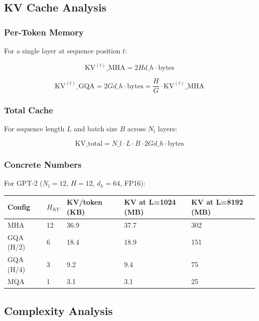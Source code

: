 \subsection{KV Cache Analysis}

\subsubsection{Per-Token Memory}

For a single layer at sequence position $t$:

\[
\text{KV}^{(t)}\_\text{MHA} = 2 H d\_h \cdot \text{bytes}
\tag{4.5}
\]

\[
\text{KV}^{(t)}\_\text{GQA} = 2 G d\_h \cdot \text{bytes} = \frac{H}{G} \cdot \text{KV}^{(t)}\_\text{MHA}
\tag{4.6}
\]

\subsubsection{Total Cache}

For sequence length $L$ and batch size $B$ across $N_l$ layers:

\[
\text{KV}\_\text{total} = N\_l \cdot L \cdot B \cdot 2 G d\_h \cdot \text{bytes}
\tag{4.7}
\]

\subsubsection{Concrete Numbers}

For GPT-2 ($N_l = 12$, $H = 12$, $d_h = 64$, FP16):

\begin{table}[H]
\centering
\small
\begin{tabular}{lllll}
\toprule
\textbf{Config} & \textbf{$H_{KV}$} & \textbf{KV/token (KB)} & \textbf{KV at L=1024 (MB)} & \textbf{KV at L=8192 (MB)} \\
\midrule
MHA & 12 & 36.9 & 37.7 & 302 \\
GQA (H/2) & 6 & 18.4 & 18.9 & 151 \\
GQA (H/4) & 3 & 9.2 & 9.4 & 75 \\
MQA & 1 & 3.1 & 3.1 & 25 \\
\bottomrule
\end{tabular}
\end{table}

\subsection{Complexity Analysis}

